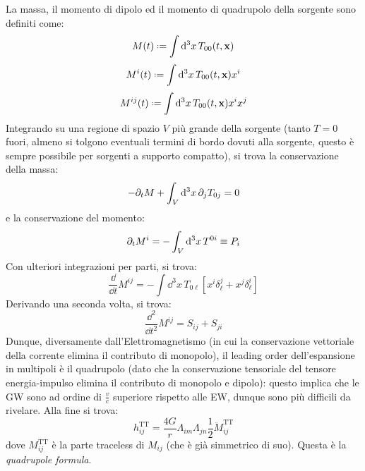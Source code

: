 La massa, il momento di dipolo ed il momento di quadrupolo della sorgente sono definiti come:
\begin{equation}
  M(t) \defeq \int \dd^3x \, T_{00}(t,\ve{x})
\end{equation}
\begin{equation}
  M^i(t) \defeq \int \dd^3x \, T_{00}(t,\ve{x}) x^i
\end{equation}
\begin{equation}
  M^{ij}(t) \defeq \int \dd^3x \, T_{00}(t,\ve{x}) x^i x^j
\end{equation}
Integrando su una regione di spazio $ V $ più grande della sorgente (tanto $ T = 0 $ fuori, almeno si tolgono eventuali termini di bordo dovuti alla sorgente, questo è sempre possibile per sorgenti a supporto compatto), si trova la conservazione della massa:
\begin{equation*}
  - \partial_t M + \int_V \mathrm{d}^3x \, \partial_j T_{0j} = 0
\end{equation*}
e la conservazione del momento:
\begin{equation*}
  \partial_t M^i = - \int_V \mathrm{d}^3x \, T^{0i} \equiv P_i
\end{equation*}
Con ulteriori integrazioni per parti, si trova:
\begin{equation*}
  \frac{\dd}{\dd t} M^{ij} = - \int \dd^3x \, T_{0\ell} \left[ x^i \delta^j_\ell + x^j \delta^i_\ell \right]
\end{equation*}
Derivando una seconda volta, si trova:
\begin{equation*}
  \frac{\dd^2}{\dd t^2} M^{ij} = S_{ij} + S_{ji}
\end{equation*}
Dunque, diversamente dall'Elettromagnetismo (in cui la conservazione vettoriale della corrente elimina il contributo di monopolo), il leading order dell'espansione in multipoli è il quadrupolo (dato che la conservazione tensoriale del tensore energia-impulso elimina il contributo di monopolo e dipolo): questo implica che le GW sono ad ordine di $ \frac{v}{c} $ superiore rispetto alle EW, dunque sono più difficili da rivelare. Alla fine si trova:
\begin{equation*}
  h_{ij}^\text{TT} = \frac{4G}{r} \Lambda_{im} \Lambda_{jn} \frac{1}{2} \ddot{M}_{ij}^\text{TT}
\end{equation*}
dove $ M_{ij}^\text{TT} $ è la parte traceless di $ M_{ij} $ (che è già simmetrico di suo). Questa è la \emph{quadrupole formula}.

